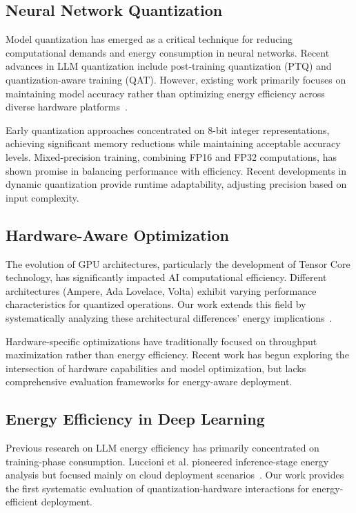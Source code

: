 \documentclass[sigconf,review]{acmart}
\begin{document}
\subsection{Neural Network Quantization}

Model quantization has emerged as a critical technique for reducing computational demands and energy consumption in neural networks. Recent advances in LLM quantization include post-training quantization (PTQ) and quantization-aware training (QAT). However, existing work primarily focuses on maintaining model accuracy rather than optimizing energy efficiency across diverse hardware platforms~\cite{dettmers2022int8}.

Early quantization approaches concentrated on 8-bit integer representations, achieving significant memory reductions while maintaining acceptable accuracy levels. Mixed-precision training, combining FP16 and FP32 computations, has shown promise in balancing performance with efficiency. Recent developments in dynamic quantization provide runtime adaptability, adjusting precision based on input complexity.

\subsection{Hardware-Aware Optimization}

The evolution of GPU architectures, particularly the development of Tensor Core technology, has significantly impacted AI computational efficiency. Different architectures (Ampere, Ada Lovelace, Volta) exhibit varying performance characteristics for quantized operations. Our work extends this field by systematically analyzing these architectural differences' energy implications~\cite{markidis2018nvidia}.

Hardware-specific optimizations have traditionally focused on throughput maximization rather than energy efficiency. Recent work has begun exploring the intersection of hardware capabilities and model optimization, but lacks comprehensive evaluation frameworks for energy-aware deployment.

\subsection{Energy Efficiency in Deep Learning}

Previous research on LLM energy efficiency has primarily concentrated on training-phase consumption. Luccioni et al. pioneered inference-stage energy analysis but focused mainly on cloud deployment scenarios~\cite{luccioni2022estimating}. Our work provides the first systematic evaluation of quantization-hardware interactions for energy-efficient deployment.
\end{document}
